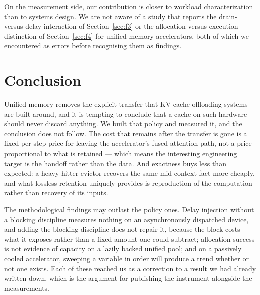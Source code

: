 \documentclass[manuscript,anonymous,review]{acmart}
\begin{document}
On the measurement side, our contribution is closer to workload
characterization than to systems design. We are not aware of a study
that reports the drain-versus-delay interaction of
Section~\ref{sec:f3} or the allocation-versus-execution distinction of
Section~\ref{sec:f4} for unified-memory accelerators, both of which we
encountered as errors before recognising them as findings.

\section{Conclusion}
\label{sec:conclusion}

Unified memory removes the explicit transfer that KV-cache offloading
systems are built around, and it is tempting to conclude that a cache
on such hardware should never discard anything. We built that policy
and measured it, and the conclusion does not follow. The cost that
remains after the transfer is gone is a fixed per-step price for
leaving the accelerator's fused attention path, not a price proportional
to what is retained --- which means the interesting engineering target
is the handoff rather than the data. And exactness buys less than
expected: a heavy-hitter evictor recovers the same mid-context fact more
cheaply, and what lossless retention uniquely provides is reproduction
of the computation rather than recovery of its inputs.

The methodological findings may outlast the policy ones. Delay
injection without a blocking discipline measures nothing on an
asynchronously dispatched device, and adding the blocking discipline
does not repair it, because the block costs what it exposes rather than
a fixed amount one could subtract; allocation success is not evidence
of capacity on a lazily backed unified pool; and on a passively cooled
accelerator, sweeping a variable in order will produce a trend whether
or not one exists. Each of these reached us as a correction to a
result we had already written down, which is the argument for
publishing the instrument alongside the measurements.


\end{document}
